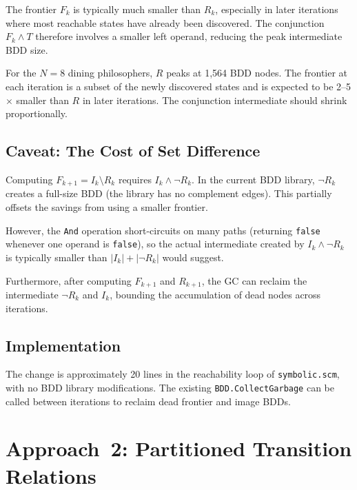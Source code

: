 \documentclass[11pt]{article}
\begin{document}
The frontier $F_k$ is typically much smaller than $R_k$, especially
in later iterations where most reachable states have already been
discovered.  The conjunction $F_k \wedge T$ therefore involves a
smaller left operand, reducing the peak intermediate BDD size.

For the $N = 8$ dining philosophers, $R$ peaks at 1,564 BDD nodes.
The frontier at each iteration is a subset of the newly discovered
states and is expected to be 2--5$\times$ smaller than $R$ in later
iterations.  The conjunction intermediate should shrink proportionally.

\subsection{Caveat: The Cost of Set Difference}

Computing $F_{k+1} = I_k \setminus R_k$ requires
$I_k \wedge \neg R_k$.  In the current BDD library, $\neg R_k$
creates a full-size BDD (the library has no complement edges).
This partially offsets the savings from using a smaller frontier.

However, the \texttt{And} operation short-circuits on many paths
(returning \texttt{false} whenever one operand is \texttt{false}),
so the actual intermediate created by $I_k \wedge \neg R_k$ is
typically smaller than $|I_k| + |\neg R_k|$ would suggest.

Furthermore, after computing $F_{k+1}$ and $R_{k+1}$, the GC
can reclaim the intermediate $\neg R_k$ and $I_k$, bounding the
accumulation of dead nodes across iterations.

\subsection{Implementation}

The change is approximately 20 lines in the reachability loop
of \texttt{symbolic.scm}, with no BDD library modifications.
The existing \texttt{BDD.CollectGarbage} can be called between
iterations to reclaim dead frontier and image BDDs.

\section{Approach~2: Partitioned Transition Relations}
\end{document}
